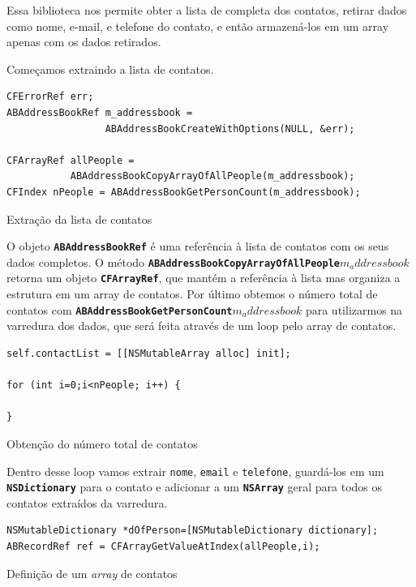 \documentclass[a4paper,12pt,brazil,doubleside]{book}
\begin{document}
\begin{singlespace}
Essa biblioteca nos permite obter a lista de completa dos contatos, retirar dados como nome, e-mail, e telefone do contato, e então armazená-los em um array apenas com os dados retirados.

Começamos extraindo a lista de contatos.

\begin{listing}[H]
\begin{verbatim}
CFErrorRef err;
ABAddressBookRef m_addressbook =
                 ABAddressBookCreateWithOptions(NULL, &err);
    
CFArrayRef allPeople =
           ABAddressBookCopyArrayOfAllPeople(m_addressbook);
CFIndex nPeople = ABAddressBookGetPersonCount(m_addressbook);
\end{verbatim}
\caption{Extração da lista de contatos}
\end{listing}


O objeto \texttt{\textbf{ABAddressBookRef}} é uma referência à lista de contatos com os seus dados completos. O método \texttt{\textbf{ABAddressBookCopyArrayOfAllPeople\(m_addressbook\)}} retorna um objeto \texttt{\textbf{CFArrayRef}}, que mantém a referência à lista mas organiza a estrutura em um array de contatos. Por último obtemos o número total de contatos com
\linebreak \texttt{\textbf{ABAddressBookGetPersonCount\(m_addressbook\)}} para utilizarmos na varredura dos dados, que será feita através de um loop pelo array de contatos.

\begin{listing}[H]
\begin{verbatim}
self.contactList = [[NSMutableArray alloc] init];

for (int i=0;i<nPeople; i++) {
    
}
\end{verbatim}
\caption{Obtenção do número total de contatos}
\end{listing}


Dentro desse loop vamos extrair \texttt{nome}, \texttt{email} e \texttt{telefone}, guardá-los em um \texttt{\textbf{NSDictionary}} para o contato e adicionar a um \texttt{\textbf{NSArray}} geral para todos os contatos extraídos da varredura.

\begin{listing}[H]
\begin{verbatim}
NSMutableDictionary *dOfPerson=[NSMutableDictionary dictionary];
ABRecordRef ref = CFArrayGetValueAtIndex(allPeople,i);
\end{verbatim}
\caption{Definição de um \emph{array} de contatos}
\end{listing}



\end{singlespace}
\end{document}
